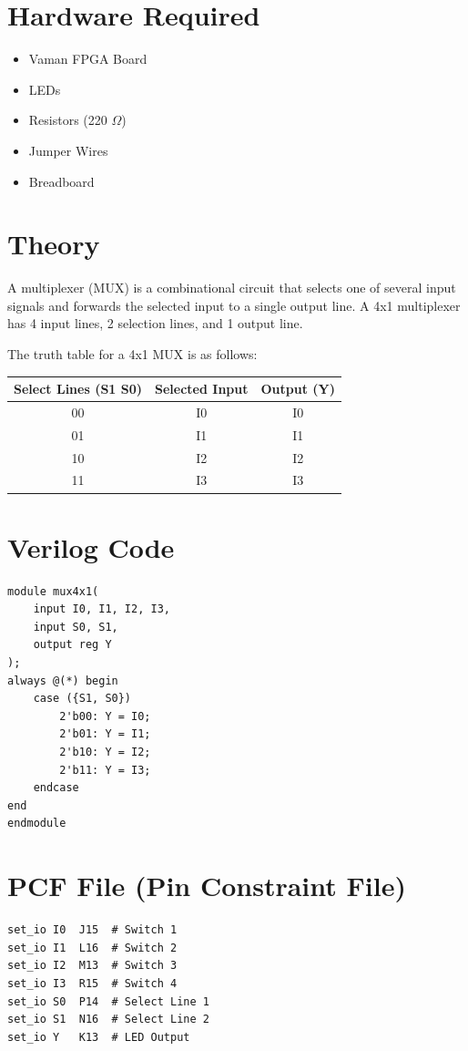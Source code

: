 \documentclass[a4paper,12pt]{article}
\begin{document}
\section*{Hardware Required}
\begin{itemize}
    \item Vaman FPGA Board
    \item LEDs
    \item Resistors (220 $\Omega$)
    \item Jumper Wires
    \item Breadboard
\end{itemize}

\section*{Theory}
A multiplexer (MUX) is a combinational circuit that selects one of several input signals and forwards the selected input to a single output line.  
A 4x1 multiplexer has 4 input lines, 2 selection lines, and 1 output line.

The truth table for a 4x1 MUX is as follows:

\begin{center}
\begin{tabular}{|c|c|c|}
\hline
Select Lines (S1 S0) & Selected Input & Output (Y) \\
\hline
00 & I0 & I0 \\
01 & I1 & I1 \\
10 & I2 & I2 \\
11 & I3 & I3 \\
\hline
\end{tabular}
\end{center}

\section*{Verilog Code}
\begin{lstlisting}[style=verilog, caption={4x1 Multiplexer Verilog Code}]
module mux4x1(
    input I0, I1, I2, I3,
    input S0, S1,
    output reg Y
);
always @(*) begin
    case ({S1, S0})
        2'b00: Y = I0;
        2'b01: Y = I1;
        2'b10: Y = I2;
        2'b11: Y = I3;
    endcase
end
endmodule
\end{lstlisting}

\section*{PCF File (Pin Constraint File)}
\begin{lstlisting}[style=verilog, caption={.pcf File for Vaman Board Pin Mapping}]
set_io I0  J15  # Switch 1
set_io I1  L16  # Switch 2
set_io I2  M13  # Switch 3
set_io I3  R15  # Switch 4
set_io S0  P14  # Select Line 1
set_io S1  N16  # Select Line 2
set_io Y   K13  # LED Output
\end{lstlisting}
\end{document}

